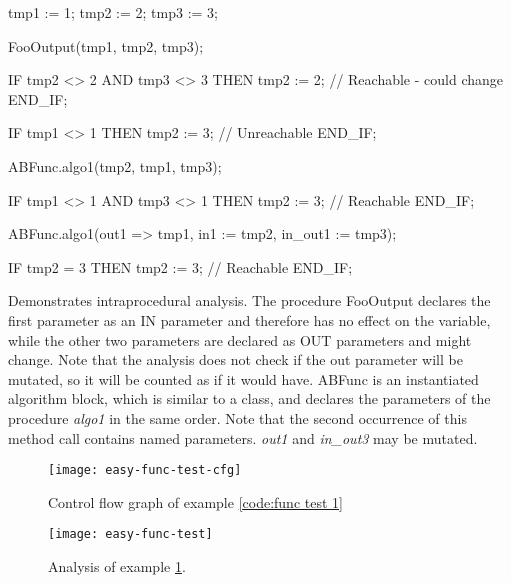 

\begin{program}[h!]
	\begin{GenericCode}
tmp1 := 1;
tmp2 := 2;
tmp3 := 3;

FooOutput(tmp1, tmp2, tmp3);

IF tmp2 <> 2 AND tmp3 <> 3 THEN
	tmp2 := 2; // Reachable - could change
END_IF;

IF tmp1 <> 1 THEN
	tmp2 := 3; // Unreachable
END_IF;

ABFunc.algo1(tmp2, tmp1, tmp3);

IF tmp1 <> 1 AND tmp3 <> 1 THEN
	tmp2 := 3; // Reachable
END_IF;

ABFunc.algo1(out1 => tmp1, in1 := tmp2, in_out1 := tmp3);

IF tmp2 = 3 THEN
	tmp2 := 3; // Reachable
END_IF;	\end{GenericCode}
	\centering
	\caption{Demonstrates intraprocedural analysis. The procedure  FooOutput declares the first parameter as an IN parameter and therefore has no effect on the variable, while the other two parameters are declared as OUT parameters and might change. Note that the analysis does not check if the out parameter will be mutated, so it will be counted as if it would have. ABFunc is an instantiated algorithm block, which is similar to a class, and declares the parameters of the procedure \emph{algo1} in the same order. Note that the second occurrence of this method call contains named parameters. \emph{out1} and \emph{in\_out3} may be mutated.}
	\label{code:func test 1}
\end{program}
\begin{figure}[h!]
	\centering
	\texttt{[image: easy-func-test-cfg]}
	\caption{Control flow graph of example \ref{code:func test 1}}
	\label{fig:func test 1 cfg}
\end{figure}
\begin{figure}[h!]
	\centering
	\texttt{[image: easy-func-test]}
	\caption{Analysis of example \ref{fig:func test 1 cfg}.}
	\label{fig:func test 1}
\end{figure}

